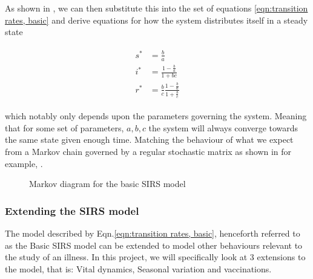 \documentclass[10pt,showpacs,preprintnumbers,amsmath,amssymb,nofootinbib,aps,prl,twocolumn,groupedaddress,superscriptaddress,showkeys]{revtex4-1}
\begin{document}
    As shown in \textcite{project5}, we can then substitute this into the set of equations \ref{eqn:transition rates, basic} and derive equations for how the system distributes itself in a steady state

    \begin{align}
      \begin{split}
        s^* &= \frac{b}{a}  \\
        i^* &= \frac{1 - \frac{b}{a}}{1 + {b}{c}} \\
        r^* &= \frac{b}{c}\frac{1 - \frac{b}{a}}{1 + \frac{b}{c}}
      \end{split}
    \end{align}

    which notably only depends upon the parameters governing the system. Meaning that for some set of parameters, $a,b,c$ the system will always converge towards the same state given enough time. Matching the behaviour of what we expect from a Markov chain governed by a regular stochastic matrix as shown in for example, \textcite[p.~277, theorem~18]{linalg_lays}.

    \begin{figure}[h!tbp]
      \centering 
       \caption{Markov diagram for the basic SIRS model\label{fig:SIRS diagram}}
    \end{figure}

    \subsubsection{Extending the SIRS model}
      The model described by Eqn.\ref{eqn:transition rates, basic}, henceforth referred to as the Basic SIRS model can be extended to model other behaviours relevant to the study of an illness. In this project, we will specifically look at 3 extensions to the model, that is: Vital dynamics, Seasonal variation and vaccinations.
\end{document}
